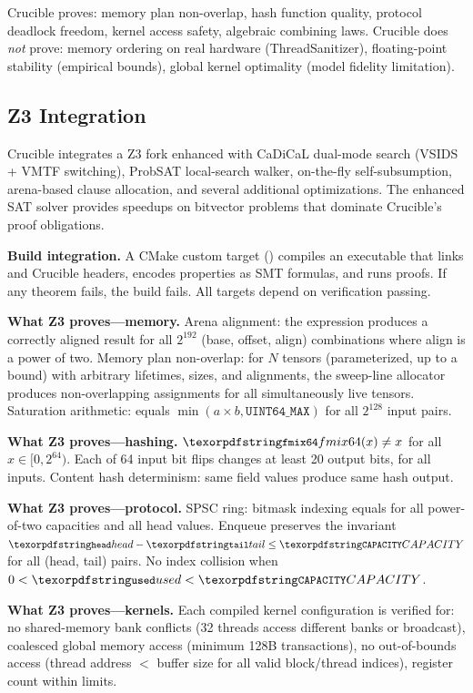 Crucible proves: memory plan non-overlap, hash function quality, protocol deadlock freedom, kernel access safety, algebraic combining laws.
Crucible does \emph{not} prove: memory ordering on real hardware (ThreadSanitizer), floating-point stability (empirical bounds), global kernel optimality (model fidelity limitation).

\subsection{Z3 Integration}

Crucible integrates a Z3 fork enhanced with CaDiCaL dual-mode search (VSIDS + VMTF switching), ProbSAT local-search walker, on-the-fly self-subsumption, arena-based clause allocation, and several additional optimizations.
The enhanced SAT solver provides speedups on bitvector problems that dominate Crucible's proof obligations.

\textbf{Build integration.}
A CMake custom target () compiles an executable that links  and Crucible headers, encodes properties as SMT formulas, and runs proofs.
If any theorem fails, the build fails.
All targets depend on verification passing.

\textbf{What Z3 proves---memory.}
Arena alignment: the expression  produces a correctly aligned result for all $2^{192}$ (base, offset, align) combinations where align is a power of two.
Memory plan non-overlap: for $N$ tensors (parameterized, up to a bound) with arbitrary lifetimes, sizes, and alignments, the sweep-line allocator produces non-overlapping assignments for all simultaneously live tensors.
Saturation arithmetic:  equals $\min(a \times b, \texttt{UINT64\_MAX})$ for all $2^{128}$ input pairs.

\textbf{What Z3 proves---hashing.}
$\code{fmix64}(x) \neq x$ for all $x \in [0, 2^{64})$.
Each of 64 input bit flips changes at least 20 output bits, for all inputs.
Content hash determinism: same field values produce same hash output.

\textbf{What Z3 proves---protocol.}
SPSC ring: bitmask indexing  equals  for all power-of-two capacities and all head values.
Enqueue preserves the invariant $\code{head} - \code{tail} \leq \code{CAPACITY}$ for all (head, tail) pairs.
No index collision when $0 < \code{used} < \code{CAPACITY}$.

\textbf{What Z3 proves---kernels.}
Each compiled kernel configuration is verified for: no shared-memory bank conflicts (32 threads access different banks or broadcast), coalesced global memory access (minimum 128B transactions), no out-of-bounds access (thread address $<$ buffer size for all valid block/thread indices), register count within limits.

